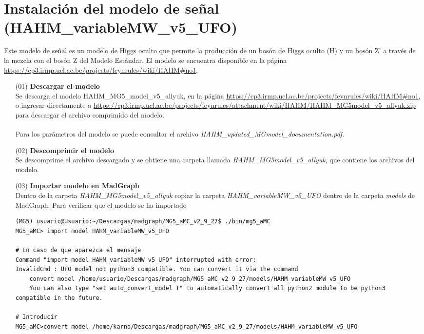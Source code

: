 \section{Instalación del modelo de señal (HAHM\_variableMW\_v5\_UFO)}
Este modelo de señal es un modelo de Higgs oculto que permite la producción de un bosón de Higgs oculto (H) y un bosón Z' a través de la mezcla con el bosón Z del Modelo Estándar. El modelo se encuentra disponible en la página \url{https://cp3.irmp.ucl.ac.be/projects/feynrules/wiki/HAHM#no1}.
\begin{itemize}
    \item[(01)] \textbf{Descargar el modelo}\\Se descarga el modelo HAHM\_MG5\_model\_v5\_allyuk, en la página \url{https://cp3.irmp.ucl.ac.be/projects/feynrules/wiki/HAHM#no1}, o ingresar directamente a \url{https://cp3.irmp.ucl.ac.be/projects/feynrules/attachment/wiki/HAHM/HAHM_MG5model_v5_allyuk.zip} para descargar el archivo comprimido del modelo.\\\\Para los parámetros del modelo se puede consultar el archivo \textit{HAHM\_updated\_MGmodel\_documentation.pdf}.
    \item[(02)] \textbf{Descomprimir el modelo}\\Se descomprime el archivo descargado y se obtiene una carpeta llamada \textit{HAHM\_MG5model\_v5\_allyuk}, que contiene los archivos del modelo.
    \item[(03)] \textbf{Importar modelo en MadGraph}\\Dentro de la carpeta \textit{HAHM\_MG5model\_v5\_allyuk} copiar la carpeta \textit{HAHM\_variableMW\_v5\_UFO} dentro de la carpeta \textit{models} de MadGraph. Para verificar que el modelo se ha importado
\begin{lstlisting}
(MG5) usuario@Usuario:~/Descargas/madgraph/MG5_aMC_v2_9_27$ ./bin/mg5_aMC
MG5_aMC> import model HAHM_variableMW_v5_UFO

# En caso de que aparezca el mensaje 
Command "import model HAHM_variableMW_v5_UFO" interrupted with error:
InvalidCmd : UFO model not python3 compatible. You can convert it via the command 
	convert model /home/usuario/Descargas/madgraph/MG5_aMC_v2_9_27/models/HAHM_variableMW_v5_UFO
	You can also type "set auto_convert_model T" to automatically convert all python2 module to be python3 compatible in the future.

# Introducir
MG5_aMC>convert model /home/karna/Descargas/madgraph/MG5_aMC_v2_9_27/models/HAHM_variableMW_v5_UFO


\end{lstlisting}
\end{itemize}
